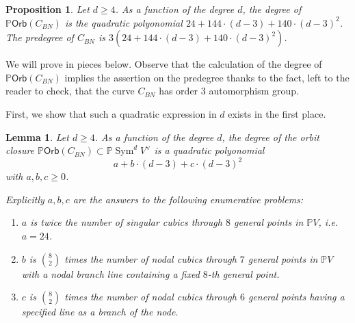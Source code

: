 \documentclass[12 pt, reqno]{amsart}
\newtheorem{prop}[thm]{Proposition}
\newtheorem{lem}[thm]{Lemma}
\theoremstyle{definition}
\newcommand{\on}{\operatorname}
\newcommand{\mb}{\mathbb}
\renewcommand{\P}{\mb{P}}
\newcommand{\Orb}{\mathsf{Orb}}
\begin{document}
\begin{prop}\label{prop:predegreepolyCBN}
  Let $d \geq 4$. As a function of the degree $d$, the degree of
  $\P \Orb(C_{BN})$ is the quadratic polyonomial
  $24 + 144\cdot (d-3) + 140 \cdot (d-3)^{2}$. The predegree of
  $C_{BN}$ is $3(24 + 144\cdot (d-3) + 140 \cdot (d-3)^{2})$.
\end{prop}
We will prove  in pieces below.  Observe
that the calculation of the degree of $\P \Orb(C_{BN})$ implies the
assertion on the predegree thanks to the fact, left to the reader to
check, that the curve $C_{BN}$ has order $3$ automorphism group.

First, we show that such a quadratic expression in $d$ exists in the
first place.

\begin{lem}\label{lem:predegreepolyCBN}
  Let $d \geq 4$. As a function of the degree $d$, the degree of the
  orbit closure $\P \Orb(C_{BN}) \subset \P \on{Sym}^{d}V^{\vee}$ is a
  quadratic polyonomial \[a + b\cdot (d-3) + c \cdot (d-3)^{2}\] with
  $a,b,c\geq 0$.

  Explicitly $a,b,c$ are the answers to the following enumerative
  problems:
  \begin{enumerate}
  \item $a$ is twice the number of singular cubics through $8$ general
    points in $\P V$, i.e. $a = 24$.
  \item $b$ is $\binom{8}{2}$ times the number of nodal cubics through
    $7$ general points in $\P V$ with a nodal branch line containing a
    fixed $8$-th general point.
  \item $c$ is $\binom{8}{2}$ times the number of nodal cubics through
    $6$ general points having a specified line as a branch of the
    node.
  \end{enumerate}
  

\end{lem}
\end{document}
